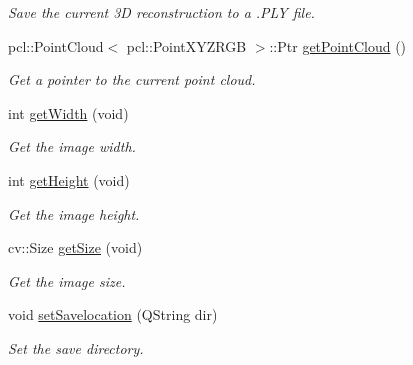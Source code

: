 \begin{DoxyCompactItemize}
\begin{DoxyCompactList}\small\item\em Save the current 3\+D reconstruction to a .P\+L\+Y file. \end{DoxyCompactList}\item 
pcl\+::\+Point\+Cloud$<$ pcl\+::\+Point\+X\+Y\+Z\+R\+G\+B $>$\+::Ptr \hyperlink{class_abstract_stereo_camera_ad8f91d2d5e03a466c1066ab27ec3116f}{get\+Point\+Cloud} ()
\begin{DoxyCompactList}\small\item\em Get a pointer to the current point cloud. \end{DoxyCompactList}\item 
int \hyperlink{class_abstract_stereo_camera_a4a1e8d3823219d718f43d5859bfc5096}{get\+Width} (void)
\begin{DoxyCompactList}\small\item\em Get the image width. \end{DoxyCompactList}\item 
int \hyperlink{class_abstract_stereo_camera_ac0918099d91f7ed95f7897610d4aa8a5}{get\+Height} (void)
\begin{DoxyCompactList}\small\item\em Get the image height. \end{DoxyCompactList}\item 
cv\+::\+Size \hyperlink{class_abstract_stereo_camera_a1f35feaeb739af86eb89a25ad58870e4}{get\+Size} (void)
\begin{DoxyCompactList}\small\item\em Get the image size. \end{DoxyCompactList}\item 
void \hyperlink{class_abstract_stereo_camera_aad94fb2509d7c36d33eb176c28963991}{set\+Savelocation} (Q\+String dir)
\begin{DoxyCompactList}\small\item\em Set the save directory. \end{DoxyCompactList}\end{DoxyCompactItemize}
